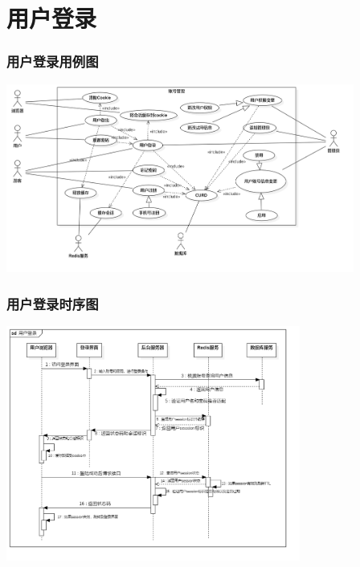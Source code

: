 \section{用户登录}
\begin{frame}
    \frametitle{用户登录用例图}
    \center
    \includegraphics[width=4.5in]{contents/figure/login_usecase_diagram.png}
\end{frame}
\begin{frame}
    \frametitle{用户登录时序图}
    \center
    \includegraphics[width=3.8in]{contents/figure/login_sequence_diagram.png}
\end{frame}
